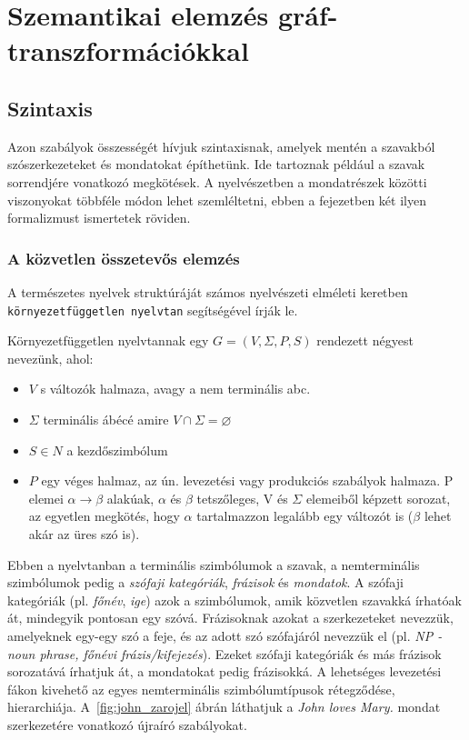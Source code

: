 \chapter{Szemantikai elemzés gráf-transzformációkkal}
\label{sec:spwgt}
\section{Szintaxis}
\label{sec:syntax}
Azon szabályok összességét hívjuk szintaxisnak, amelyek mentén a szavakból szószerkezeteket és mondatokat építhetünk. Ide tartoznak például a szavak sorrendjére vonatkozó megkötések. A nyelvészetben a mondatrészek közötti viszonyokat többféle módon lehet szemléltetni, ebben a fejezetben két ilyen formalizmust ismertetek röviden.

\subsection{A közvetlen összetevős elemzés}
\label{sec:tree}

A természetes nyelvek struktúráját számos nyelvészeti elméleti keretben \texttt{környezetfüggetlen nyelvtan} segítségével írják le.

Környezetfüggetlen nyelvtannak egy $G=(V,\Sigma ,P,S)$ rendezett négyest nevezünk, ahol:

\begin{itemize}
	\item \emph{$V$} s változók halmaza, avagy a nem terminális abc.
	\item \emph{$\Sigma$} terminális ábécé amire $ V \cap \Sigma =\varnothing $
	\item \emph{$S \in N$} a kezdőszimbólum
	\item \emph{$P$} egy véges halmaz, az ún. levezetési vagy produkciós szabályok halmaza. P elemei
$\alpha \to \beta$ alakúak, $\alpha$ és $\beta$ tetszőleges, V és $\Sigma$ elemeiből képzett sorozat, az egyetlen
megkötés, hogy $\alpha$ tartalmazzon legalább egy változót is ($\beta$ lehet akár az üres szó is).
\end{itemize}
\cite{Friedl:2003}
Ebben a nyelvtanban a terminális szimbólumok a szavak, a nemterminális szimbólumok pedig a \textit{szófaji kategóriák}, \textit{frázisok} és \textit{mondatok}. A szófaji kategóriák (pl. \textit{főnév}, \textit{ige}) azok a szimbólumok, amik közvetlen szavakká írhatóak át, mindegyik pontosan egy szóvá. Frázisoknak azokat a szerkezeteket nevezzük, amelyeknek egy-egy szó a feje, és az adott szó szófajáról nevezzük el (pl. \textit{NP - noun phrase, főnévi frázis/kifejezés}). Ezeket szófaji kategóriák és más frázisok sorozatává írhatjuk át, a mondatokat pedig frázisokká.
A lehetséges levezetési fákon kivehető az egyes nemterminális szimbólumtípusok rétegződése, hierarchiája.  A~\ref{fig:john_zarojel} ábrán láthatjuk a \textit{John loves Mary.} mondat szerkezetére vonatkozó újraíró szabályokat.

